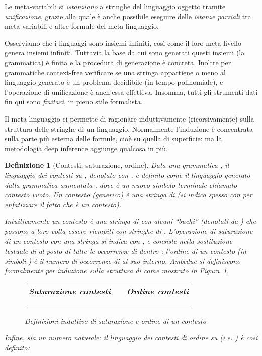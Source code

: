 \documentclass[12pt,a4paper,openright,twoside]{report}
\newtheorem{dfn}[thm]{Definizione}
\begin{document}
Le meta-variabili si \emph{istanziano} a stringhe del linguaggio oggetto tramite \emph{unificazione}, grazie alla quale \`e anche possibile eseguire delle \emph{istanze parziali} tra meta-variabili e altre formule del meta-linguaggio.

Osserviamo che i linguaggi sono insiemi infiniti, cos\`i come il loro meta-livello genera insiemi infiniti. Tuttavia la base da cui sono generati questi insiemi (la grammatica) \`e finita e la procedura di generazione \`e concreta. Inoltre per grammatiche context-free verificare se una stringa appartiene o meno al linguaggio generato \`e un problema decidibile (in tempo polinomiale), e l'operazione di unificazione \`e anch'essa effettiva. Insomma, tutti gli strumenti dati fin qui sono \emph{finitari}, in pieno stile formalista.

Il meta-linguaggio ci permette di ragionare induttivamente (ricorsivamente) sulla struttura delle stringhe di un linguaggio. Normalmente l'induzione \`e concentrata sulla parte pi\`u esterna delle formule, cio\`e su quella di superficie: ma la metodologia deep inference aggiunge qualcosa in pi\`u.

\begin{dfn}[Contesti, saturazione, ordine]
Data una grammatica , il \emph{linguaggio dei contesti su} , denotato con , \`e definito come il linguaggio generato dalla grammatica aumentata , dove  \`e un nuovo simbolo terminale chiamato \emph{contesto vuoto}. Un \emph{contesto (generico)} \`e una stringa di  (si indica spesso con  per enfatizzare il fatto che \`e un contesto).

Intuitivamente un contesto \`e una stringa di  con alcuni ``buchi'' (denotati da ) che possono a loro volta essere riempiti con stringhe di . L'operazione di \emph{saturazione di un contesto}  \emph{con una stringa}  si indica con , e consiste nella sostituzione testuale di  al posto di tutte le occorrenze di  dentro ; l'\emph{ordine di un contesto} (in simboli ) \`e il numero di occorrenze di  al suo interno. Ambedue si definiscono formalmente per induzione sulla struttura di  come mostrato in Figura~\ref{fig:satordctx}.

\begin{figure}
\begin{center}
\begin{tabular}{lclclcl}
	\multicolumn{3}{c}{\textbf{Saturazione contesti}} & \hspace{5em} & \multicolumn{3}{c}{\textbf{Ordine contesti}} \\
	 &  &  & &  &  &  \\
	 &  &  & &  &  &  \\
	 &  &  & &  &  & 
\end{tabular}
\end{center}
\caption{Definizioni induttive di \emph{saturazione} e \emph{ordine} di un contesto}
\label{fig:satordctx}
\end{figure}

Infine, sia  un numero naturale: il \emph{linguaggio dei contesti di ordine}  \emph{su}  (i.e. ) \`e cos\`i definito:

\end{dfn}
\end{document}
